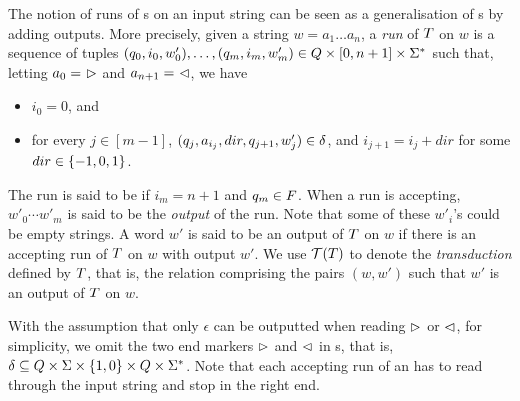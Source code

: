 The notion of runs of \FFT{}s on an input string can be seen as a generalisation 
of \FFA{}s by adding outputs. More precisely, given a string $w = a_1 \dots a_n$, a \emph{run} of $T$ on $w$
is a
sequence of tuples $(q_0, i_0, w'_0),\ldots, (q_m, i_m, w'_m) \in Q \times
[0, n+1] \times \Sigma^*$ 
such that, letting $a_0 =\ \vartriangleright$ and $a_{n+1} =\ \vartriangleleft$, 
we have %
\begin{itemize}
    \item $i_0 = 0$, and
    \item for every $j \in [m-1]$, $(q_j, a_{i_j}, dir, q_{j+1}, w'_j) \in
        \delta$, and $i_{j+1} = i_j + dir$ for some $dir \in \{-1, 0, 1\}$.
\end{itemize}
The run is said to be  if $i_m = n+1$ and $q_m \in F$.
When a run is accepting, $w'_0 \cdots w'_m$ is said to be the \emph{output} of the
run. Note that some of these $w'_i$'s could be empty strings.
A word $w'$ is said to be an output of $T$ on $w$ if there is an accepting run of
$T$ on $w$ with output $w'$. We use $\mathcal{T}(T)$ to denote the
\emph{transduction} defined by $T$, that is, the relation comprising
the pairs $(w,w')$ such that $w'$ is an output of $T$ on $w$. 

With the assumption that only $\epsilon$ can be outputted when reading $\vartriangleright$ or $\vartriangleleft$, for simplicity, we omit the two end markers $\vartriangleright$ and $\vartriangleleft$ in \FT{}s, that is, $\delta \subseteq Q \times \Sigma \times
    \{1,0\} \times Q \times \Sigma^*$. Note that each accepting run of an \FT{} has to read through the input string and stop in the right end.



